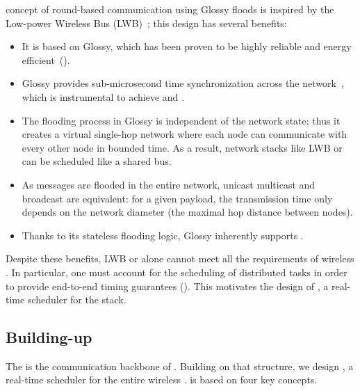 \TTnet concept of round-based communication using Glossy floods is inspired by the Low-power Wireless Bus (LWB)~\cite{ferrari2012LWB}; this design has several benefits:
\begin{itemize}

	\item
	It is based on Glossy, which has been proven to be highly reliable and energy efficient~(\cite{schuss2017Competition,lim2017Competition,escobar-molero2019Improving}).

	\item
	Glossy provides sub-microsecond time synchronization across the network~\cite{ferrari2011Glossy}, which is instrumental to achieve  and .

	\item
	The flooding process in Glossy is independent of the network state; thus it creates a virtual single-hop network where each node can communicate with every other node in bounded time. As a result, network stacks like LWB or \TTnet can be scheduled like a shared bus.

	\item
	As messages are flooded in the entire network, unicast multicast and broadcast are equivalent: for a given payload, the transmission time only depends on the network diameter (the maximal hop distance between nodes).

	\item
	Thanks to its stateless flooding logic, Glossy inherently supports .

\end{itemize}

Despite these benefits, LWB or \TTnet alone cannot meet all the requirements of wireless \CPS. In particular, one must account for the scheduling of distributed tasks in order to provide end-to-end timing guarantees ().
\linebreak
This motivates the design of \TTW, a real-time scheduler for the \TTnet stack.

\subsection{Building-up \TTW}
\label{subsec:ttw_concepts}

The \TTnet is the communication backbone of \TTW.
Building on that structure, we design \TTW, a real-time scheduler for the entire wireless \CPS.
\linebreak
\TTW is based on four key concepts.

